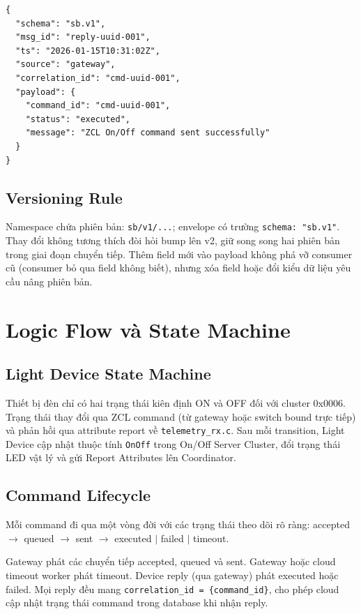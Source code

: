 \begin{lstlisting}[language={}, caption={Command reply message}]
{
  "schema": "sb.v1",
  "msg_id": "reply-uuid-001",
  "ts": "2026-01-15T10:31:02Z",
  "source": "gateway",
  "correlation_id": "cmd-uuid-001",
  "payload": {
    "command_id": "cmd-uuid-001",
    "status": "executed",
    "message": "ZCL On/Off command sent successfully"
  }
}
\end{lstlisting}

\subsection{Versioning Rule}
\label{sec:ch2-versioning}

Namespace chứa phiên bản: \texttt{sb/v1/...}; envelope có trường
\texttt{schema: "sb.v1"}. Thay đổi không tương thích đòi hỏi bump
lên v2, giữ song song hai phiên bản trong giai đoạn chuyển tiếp.
Thêm field mới vào payload không phá vỡ consumer cũ (consumer bỏ qua
field không biết), nhưng xóa field hoặc đổi kiểu dữ liệu yêu cầu
nâng phiên bản.

\section{Logic Flow và State Machine}
\label{sec:ch2-logic-flow}

\subsection{Light Device State Machine}
\label{sec:ch2-light-fsm}

Thiết bị đèn chỉ có hai trạng thái kiên định ON và OFF đối với
cluster 0x0006. Trạng thái thay đổi qua ZCL command (từ gateway hoặc
switch bound trực tiếp) và phản hồi qua attribute report về
\texttt{telemetry\_rx.c}. Sau mỗi transition, Light Device cập nhật
thuộc tính \texttt{OnOff} trong On/Off Server Cluster, đổi trạng thái
LED vật lý và gửi Report Attributes lên Coordinator.

\subsection{Command Lifecycle}
\label{sec:ch2-gateway-flow}

Mỗi command đi qua một vòng đời với các trạng thái theo dõi rõ ràng:
accepted $\rightarrow$ queued $\rightarrow$ sent $\rightarrow$
executed $|$ failed $|$ timeout.

Gateway phát các chuyển tiếp accepted, queued và sent. Gateway hoặc
cloud timeout worker phát timeout. Device reply (qua gateway) phát
executed hoặc failed. Mọi reply đều mang
\texttt{correlation\_id = \{command\_id\}}, cho phép cloud cập nhật
trạng thái command trong database khi nhận reply.

